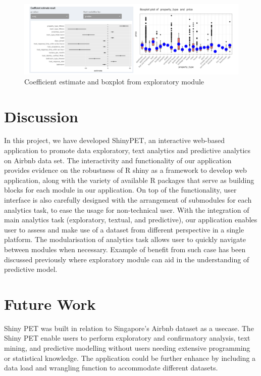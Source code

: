\documentclass{acm_proc_article-sp}
\begin{document}
\begin{figure}[H]

{\centering \includegraphics[width=1\linewidth]{images/LMcoeff} 

}

\caption{Coefficient estimate and boxplot from exploratory module}\label{fig:unnamed-chunk-21}
\end{figure}

\hypertarget{discussion}{%
\section{Discussion}\label{discussion}}

In this project, we have developed ShinyPET, an interactive web-based
application to promote data exploratory, text analytics and predictive
analytics on Airbnb data set. The interactivity and functionality of our
application provides evidence on the robustness of R shiny as a
framework to develop web application, along with the variety of
available R packages that serve as building blocks for each module in
our application. On top of the functionality, user interface is also
carefully designed with the arrangement of submodules for each analytics
task, to ease the usage for non-technical user. With the integration of
main analytics task (exploratory, textual, and predictive), our
application enables user to assess and make use of a dataset from
different perspective in a single platform. The modularisation of
analytics task allows user to quickly navigate between modules when
necessary. Example of benefit from such case has been discussed
previously where exploratory module can aid in the understanding of
predictive model.

\hypertarget{future-work}{%
\section{Future Work}\label{future-work}}

Shiny PET was built in relation to Singapore's Airbnb dataset as a
usecase. The Shiny PET enable users to perform exploratory and
confirmatory analysis, text mining, and predictive modelling without
users needing extensive programming or statistical knowledge. The
application could be further enhance by including a data load and
wrangling function to accommodate different datasets.
\end{document}
